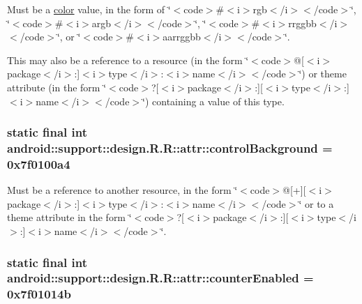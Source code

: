 Must be a \hyperlink{classandroid_1_1support_1_1design_1_1_r_1_1color}{color} value, in the form of \char`\"{}$<$code$>$\#$<$i$>$rgb$<$/i$>$$<$/code$>$\char`\"{}, \char`\"{}$<$code$>$\#$<$i$>$argb$<$/i$>$$<$/code$>$\char`\"{}, \char`\"{}$<$code$>$\#$<$i$>$rrggbb$<$/i$>$$<$/code$>$\char`\"{}, or \char`\"{}$<$code$>$\#$<$i$>$aarrggbb$<$/i$>$$<$/code$>$\char`\"{}. 

This may also be a reference to a resource (in the form \char`\"{}$<$code$>$@\mbox{[}$<$i$>$package$<$/i$>$:\mbox{]}$<$i$>$type$<$/i$>$:$<$i$>$name$<$/i$>$$<$/code$>$\char`\"{}) or theme attribute (in the form \char`\"{}$<$code$>$?\mbox{[}$<$i$>$package$<$/i$>$:\mbox{]}\mbox{[}$<$i$>$type$<$/i$>$:\mbox{]}$<$i$>$name$<$/i$>$$<$/code$>$\char`\"{}) containing a value of this type. \hypertarget{classandroid_1_1support_1_1design_1_1_r_1_1attr_07d6c4e2708374eab645fb4a610773b4}{
\subsubsection[{controlBackground}]{\setlength{\rightskip}{0pt plus 5cm}static final int android::support::design.R.R::attr::controlBackground = 0x7f0100a4}}
\label{classandroid_1_1support_1_1design_1_1_r_1_1attr_07d6c4e2708374eab645fb4a610773b4}


Must be a reference to another resource, in the form \char`\"{}$<$code$>$@\mbox{[}+\mbox{]}\mbox{[}$<$i$>$package$<$/i$>$:\mbox{]}$<$i$>$type$<$/i$>$:$<$i$>$name$<$/i$>$$<$/code$>$\char`\"{} or to a theme attribute in the form \char`\"{}$<$code$>$?\mbox{[}$<$i$>$package$<$/i$>$:\mbox{]}\mbox{[}$<$i$>$type$<$/i$>$:\mbox{]}$<$i$>$name$<$/i$>$$<$/code$>$\char`\"{}. \hypertarget{classandroid_1_1support_1_1design_1_1_r_1_1attr_9b9fcbb152d3f8d41765a2422dbaa690}{
\subsubsection[{counterEnabled}]{\setlength{\rightskip}{0pt plus 5cm}static final int android::support::design.R.R::attr::counterEnabled = 0x7f01014b}}
\label{classandroid_1_1support_1_1design_1_1_r_1_1attr_9b9fcbb152d3f8d41765a2422dbaa690}


